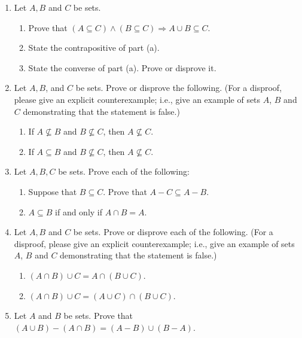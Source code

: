 \begin{enumerate}

\item Let $A,B$ and $C$ be sets. 
 \begin{enumerate}
 \item Prove that $(A \subseteq C) \wedge (B \subseteq C) \Rightarrow A \cup B \subseteq C$.
 \item State the contrapositive of part (a).
 \item State the converse of part (a). Prove or disprove it.
 \end{enumerate}





 
 \item Let $A,B$, and $C$ be sets. Prove or disprove the following. (For a disproof, please give an explicit counterexample; i.e., give an example of sets $A$, $B$ and $C$ demonstrating that the statement is false.)
 \begin{enumerate}
 \item If $A \not \subseteq B$ and $B \not \subseteq C$, then $A \not \subseteq C$.
 \item If $A \subseteq B$ and $B \not \subseteq C$, then $A \not \subseteq C$.
 \end{enumerate}
 
 \item Let $A,B,C$ be sets. Prove each of the following:
 \begin{enumerate}
 \item Suppose that $B \subseteq C$. Prove that $A-C \subseteq A-B$.
 \item $A \subseteq B$ if and only if $A \cap B = A$.
 \end{enumerate}
 
  \item Let $A,B$ and $C$ be sets. Prove or disprove each of the following. (For a disproof, please give an explicit counterexample; i.e., give an example of sets $A$, $B$ and $C$ demonstrating that the statement is false.)
 \begin{enumerate}
\item $(A \cap B ) \cup C = A \cap (B  \cup C)$.
\item $(A \cap B ) \cup C = (A \cup C) \cap (B  \cup C)$.
 \end{enumerate}

\item Let $A$ and $B$ be sets. Prove that $(A \cup B) - (A \cap B) = (A - B) \cup (B - A)$.
  \newpage


\end{enumerate}
